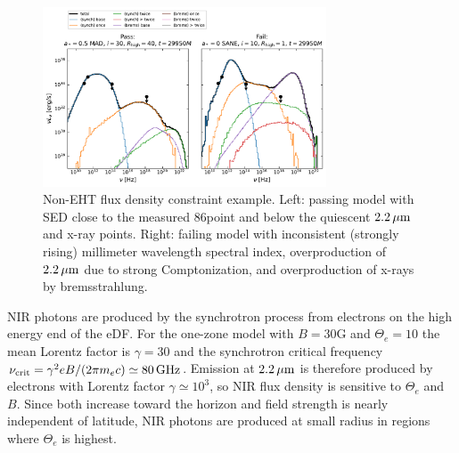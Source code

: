 \begin{figure}
  \centering
  \includegraphics[width=0.75\textwidth]{figures/passfail_sed.pdf}
  \caption{
    Non-EHT flux density constraint example.  Left: passing model with SED close to the measured 86\GHz point and below the quiescent $2.2\,\mu\mathrm{m}$ and x-ray points.  Right: failing model with inconsistent (strongly rising) millimeter wavelength spectral index, overproduction of $2.2\,\mu\mathrm{m}$ due to strong Comptonization, and overproduction of x-rays by bremsstrahlung.
    }
  \label{fig:passfail_sed}
\end{figure}


NIR photons are produced by the synchrotron process from electrons on the high energy end of the eDF.  For the one-zone model with $B = 30$G and $\Theta_e = 10$ the mean Lorentz factor is $\gamma = 30$ and the synchrotron critical frequency $\nu_\mathrm{crit} = \gamma^2 e B/(2 \pi m_e c) \simeq 80\,\mathrm{GHz}$.  Emission at $2.2\,\mu\mathrm{m}$ is therefore produced by electrons with  Lorentz factor $\gamma \simeq 10^3$, so NIR flux density is sensitive to $\Theta_e$ and $B$.  Since both increase toward the horizon and field strength is nearly independent of latitude, NIR photons are produced at small radius in regions where $\Theta_e$ is highest.

